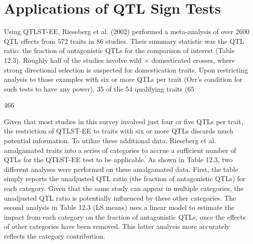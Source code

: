 \documentclass{article}
\begin{document}
\section{Applications of QTL Sign Tests}
Using QTLST-EE, Rieseberg et al. (2002) performed a meta-analysis of over 2600 QTL effects from 572 traits in 86 studies. Their summary statistic was the QTL ratio: the fraction of antagonistic QTLs for the comparison of interest (Table 12.3). Roughly half of the studies involve wild × domesticated crosses, where strong directional selection is suspected for domestication traits. Upon restricting analysis to those examples with six or more QTLs per trait (Orr's condition for such tests to have any power), 35 of the 54 qualifying traits (65%

466

Given that most studies in this survey involved just four or five QTLs per trait, the restriction of QTLST-EE to traits with six or more QTLs discards much potential information. To utilize these additional data, Rieseberg et al. amalgamated traits into a series of categories to accrue a sufficient number of QTLs for the QTLST-EE test to be applicable. As shown in Table 12.3, two different analyses were performed on these amalgamated data. First, the table simply reports the unadjusted QTL ratio (the fraction of antagonistic QTLs) for each category. Given that the same study can appear in multiple categories, the unadjusted QTL ratio is potentially influenced by these other categories. The second analysis in Table 12.3 (LS means) uses a linear model to estimate the impact from each category on the fraction of antagonistic QTLs, once the effects of other categories have been removed. This latter analysis more accurately reflects the category contribution.
\end{document}
